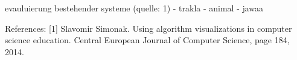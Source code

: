 evauluierung bestehender systeme (quelle: 1)
- trakla
- animal
- jawaa

References:
[1] Slavomir Simonak. Using algorithm visualizations in computer science education. Central European Journal of Computer Science, page 184, 2014.